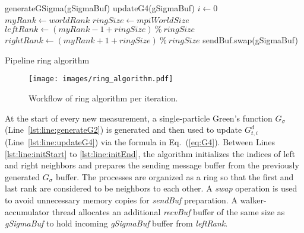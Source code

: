 \begin{algorithm}
\SetAlgoLined
    generateGSigma(gSigmaBuf)\; \label{lst:line:generateG2}
    updateG4(gSigmaBuf)\;       \label{lst:line:updateG4}
    {$i\leftarrow 0$}\;         \label{lst:line:initStart}
    {$myRank \leftarrow worldRank$}\;          \label{lst:line:initRankId}
    {$ringSize \leftarrow mpiWorldSize$}\;      \label{lst:line:initRingSize}
    {$leftRank \leftarrow (myRank - 1 + ringSize) \: \% \: ringSize $}\;
    {$rightRank \leftarrow (myRank + 1 + ringSize) \: \% \: ringSize $}\;
    sendBuf.swap(gSigmaBuf)\;           \label{lst:line:initEnd}
\caption{Pipeline ring algorithm}
\label{alg:ring_algorithm_code}
\end{algorithm}

\begin{figure}
	\centering
	\texttt{[image: images/ring\_algorithm.pdf]}
	\caption{Workflow of ring algorithm per iteration. }
	\label{fig:ring_algorithm_figure}
\end{figure}

At the start of every new measurement, a single-particle Green's function $G_{\sigma}$
 (Line~\ref{lst:line:generateG2}) is generated 
and then used to update $G^d_{t,i}$ (Line~\ref{lst:line:updateG4})
via the formula in Eq.~(\ref{eq:G4}).
%
%
Between Lines \ref{lst:line:initStart} to \ref{lst:line:initEnd}, the algorithm 
initializes the indices
of left and right neighbors and prepares the sending message buffer from the
previously generated $G_{\sigma}$ buffer. 
%
The processes are organized as a ring so that the first and last rank are considered to be neighbors to each other. 
%
A \textit{swap} operation is used to avoid unnecessary memory copies for \textit{sendBuf} preparation.
%
A walker-accumulator thread allocates an additional \textit{recvBuf} buffer of the same size 
as \textit{gSigmaBuf} to hold incoming 
\textit{gSigmaBuf} buffer from \textit{leftRank}. 

